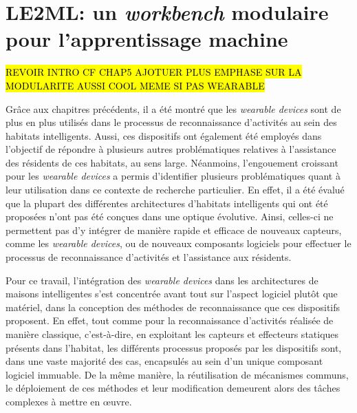 \chapter{LE2ML: un \textit{workbench} modulaire pour l'apprentissage machine}
\label{chap:6}

\hl{REVOIR INTRO CF CHAP5 AJOTUER PLUS EMPHASE SUR LA MODULARITE AUSSI COOL MEME SI PAS WEARABLE}

Grâce aux chapitres précédents, il a été montré que les \textit{wearable devices} sont de plus en plus utilisés dans le processus de reconnaissance d'activités au sein des habitats intelligents. Aussi, ces dispositifs ont également été employés dans l'objectif de répondre à plusieurs autres problématiques relatives à l'assistance des résidents de ces habitats, au sens large. Néanmoins, l'engouement croissant pour les \textit{wearable devices} a permis d'identifier plusieurs problématiques quant à leur utilisation dans ce contexte de recherche particulier. En effet, il a été évalué que la plupart des différentes architectures d'habitats intelligents qui ont été proposées n'ont pas été conçues dans une optique évolutive. Ainsi, celles-ci ne permettent pas d'y intégrer de manière rapide et efficace de nouveaux capteurs, comme les \textit{wearable devices}, ou de nouveaux composants logiciels pour effectuer le processus de reconnaissance d'activités et l'assistance aux résidents.

Pour ce travail, l'intégration des \textit{wearable devices} dans les architectures de maisons intelligentes s'est concentrée avant tout sur l'aspect logiciel plutôt que matériel, dans la conception des méthodes de reconnaissance que ces dispositifs proposent. En effet, tout comme pour la reconnaissance d'activités réalisée de manière classique, c'est-à-dire, en exploitant les capteurs et effecteurs statiques présents dans l'habitat, les différents processus proposés par les dispositifs sont, dans une vaste majorité des cas, encapsulés au sein d'un unique composant logiciel immuable. De la même manière, la réutilisation de mécanismes communs, le déploiement de ces méthodes et leur modification demeurent alors des tâches complexes à mettre en \oe{}uvre.

